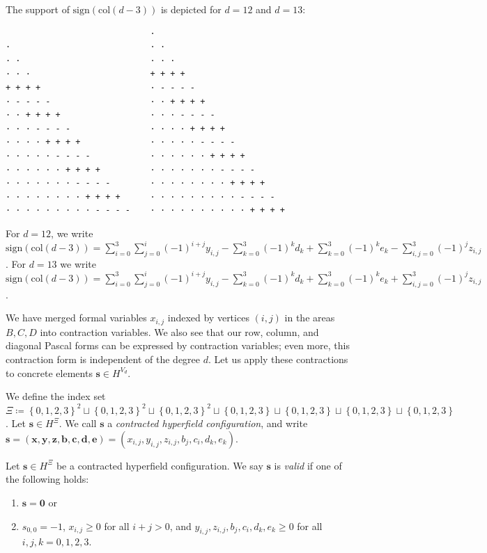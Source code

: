 \begin{example}
    The support of \( \mathrm{sign}(\mathrm{col}(d-3)) \) is depicted for \( d = 12 \) and \( d = 13 \):
    \begin{verbatim}
                             · 
·                            · ·    
· ·                          · · ·
· · ·                        + + + + 
+ + + +                      · - - - - 
· - - - -                    · · + + + + 
· · + + + +                  · · · - - - - 
· · · - - - -                · · · · + + + + 
· · · · + + + +              · · · · · - - - - 
· · · · · - - - -            · · · · · · + + + + 
· · · · · · + + + +          · · · · · · · - - - - 
· · · · · · · - - - -        · · · · · · · · + + + + 
· · · · · · · · + + + +      · · · · · · · · · - - - -
· · · · · · · · · - - - -    · · · · · · · · · · + + + +
    \end{verbatim}
    For \( d = 12 \), we write \( \mathrm{sign}(\mathrm{col}(d-3)) = \sum^3_{i=0}\sum^i_{j=0} (-1)^{i+j}y_{i,j} - \sum^3_{k=0}(-1)^{k}d_k  + \sum^3_{k=0}(-1)^{k}e_k - \sum^3_{i,j=0}(-1)^{j}z_{i,j} \). For \( d = 13 \) we write \( \mathrm{sign}(\mathrm{col}(d-3)) = \sum^3_{i=0}\sum^i_{j=0} (-1)^{i+j}y_{i,j} - \sum^3_{k=0}(-1)^{k}d_k  + \sum^3_{k=0}(-1)^{k}e_k + \sum^3_{i,j=0}(-1)^{j}z_{i,j} \).
\end{example}

We have merged formal variables \( x_{i,j} \) indexed by vertices \( (i,j) \) in the areas \( B, C, D \) into contraction variables. We also see that our row, column, and diagonal Pascal forms can be expressed by contraction variables; even more, this contraction form is independent of the degree \( d \). Let us apply these contractions to concrete elements \( \mathbf{s} \in H^{V_d} \).

\begin{definition}
    We define the index set \(  \Xi \coloneqq \left\{ 0,1,2,3 \right\}^2 \sqcup \left\{ 0,1,2,3 \right\}^2 \sqcup \left\{ 0,1,2,3 \right\}^2 \sqcup \left\{ 0,1,2,3 \right\} \sqcup \left\{ 0,1,2,3 \right\} \sqcup \left\{ 0,1,2,3 \right\} \sqcup \left\{ 0,1,2,3 \right\} \).
    Let \( \mathbf{s} \in H^{\Xi} \). We call \( \mathbf{s} \) a \emph{contracted hyperfield configuration}, and write \( \mathbf{s} = (\mathbf{x}, \mathbf{y}, \mathbf{z}, \mathbf{b}, \mathbf{c}, \mathbf{d}, \mathbf{e}) = (x_{i,j}, y_{i,j}, z_{i,j}, b_j, c_i, d_k, e_k) \).
\end{definition}

\begin{definition}
    Let \( \mathbf{s} \in H^{\Xi}\) be a {contracted hyperfield configuration}.
    We say \( \mathbf{s} \) is \emph{valid} if one of the following holds:
    \begin{enumerate}
        \item \( \mathbf{s} = \mathbf{0} \) or
        \item \( s_{0,0} = -1 \), \( x_{i,j} \geq 0 \) for all \( i+j > 0 \), and \(  y_{i,j}, z_{i,j}, b_j, c_i, d_k, e_k \geq 0 \) for all \( i,j,k = 0,1,2,3 \).
    \end{enumerate}
\end{definition}

